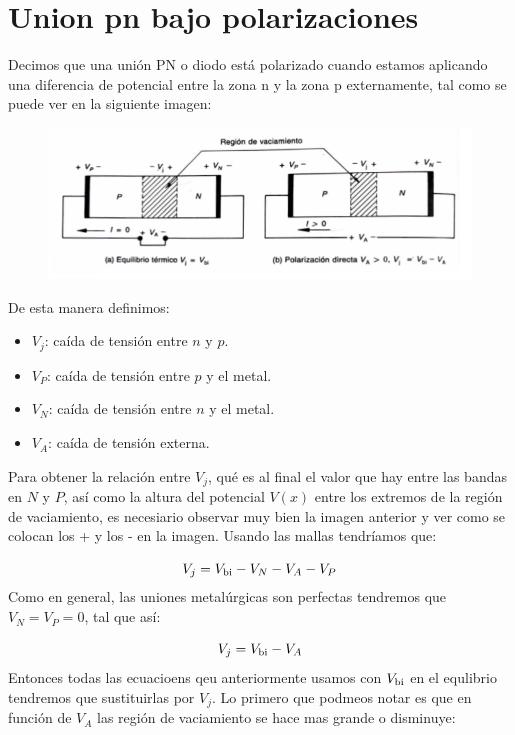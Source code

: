 \section{Union pn bajo polarizaciones}

Decimos que una unión PN o diodo está polarizado cuando estamos aplicando una diferencia de potencial entre la zona n y la zona p externamente, tal como se puede ver en la siguiente imagen: 

\begin{figure}[h!] \centering
    \includegraphics[width=0.7\linewidth]{Cuerpo/Ch_03/03_Temario_05.png}
\end{figure}
De esta manera definimos:

\begin{itemize}
    \item $V_j$: caída de tensión entre $n$ y $p$.
    \item $V_P$: caída de tensión entre $p$ y el metal.
    \item $V_N$: caída de tensión entre $n$ y el metal.
    \item $V_A$: caída de tensión externa.
\end{itemize}
Para obtener la relación entre $V_j$, qué es al final el valor que hay entre las bandas en $N$ y $P$, así como la altura del potencial $V(x)$ entre los extremos de la región de vaciamiento, es necesiario observar muy bien la imagen anterior y ver como se colocan los + y los - en la imagen. Usando las mallas tendríamos que: 

\begin{equation}
    V_j = V_{\text{bi}} - V_N - V_A - V_P
\end{equation}
Como en general, las uniones metalúrgicas son perfectas tendremos que $V_N=V_P=0$, tal que así: 


\begin{equation}
    V_j = V_{\text{bi}} - V_A
\end{equation}
Entonces todas las ecuacioens qeu anteriormente usamos con $V_{\text{bi}}$ en el equlibrio tendremos que sustituirlas por $V_j$. Lo primero que podmeos notar es que en función de $V_A$ las región de vaciamiento se hace mas grande o disminuye: 


